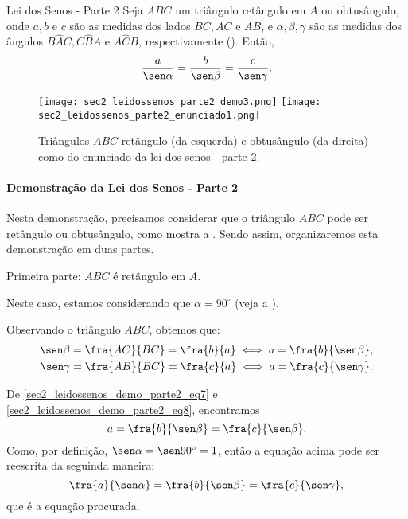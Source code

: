 \begin{observationtitle}{Lei dos Senos - Parte 2}
\label{sec2_leidossenos_parte2}
Seja $ABC$ um triângulo retângulo em $A$ ou obtusângulo, onde $a, b$ e $c$ são as medidas dos lados $BC, AC$ e $AB$, e $\alpha, \beta, \gamma$ são as medidas dos ângulos $B\hat{A}C,C\hat{B}A$ e $A\hat{C}B$, respectivamente (). Então,
\begin{equation}\label{sec2_leidossenos_eq_parte2}
    \frac{a}{\sen\alpha} = \frac{b}{\sen\beta} = \frac{c}{\sen\gamma}.
\end{equation}
\begin{figure}[H]
    \centering
    \texttt{[image: sec2\_leidossenos\_parte2\_demo3.png]}
    \qquad
    \texttt{[image: sec2\_leidossenos\_parte2\_enunciado1.png]}
    \caption{Triângulos $ABC$ retângulo (da esquerda) e obtusângulo (da direita) como do enunciado da lei dos senos - parte 2.}
    \label{sec2_leidossenos_parte2_enunciado_fig}
\end{figure}

\end{observationtitle}


\paragraph{Demonstração da Lei dos Senos - Parte 2}

Nesta demonstração, precisamos considerar que o triângulo $ABC$ pode ser retângulo ou obtusângulo, como mostra a . Sendo assim, organizaremos esta demonstração em duas partes. 

Primeira parte: $ABC$ é retângulo em $A$.

Neste caso, estamos considerando que $\alpha=90^\circ$ (veja a ).

Observando o triângulo $ABC$, obtemos que:
\begin{eqnarray}
\sen\beta=\fra{AC}{BC}=\fra{b}{a} \iff a=\fra{b}{\sen\beta},   \label{sec2_leidossenos_demo_parte2_eq7} \\ 
\sen\gamma=\fra{AB}{BC}=\fra{c}{a} \iff a=\fra{c}{\sen\gamma}.   \label{sec2_leidossenos_demo_parte2_eq8} 
\end{eqnarray}

De \eqref{sec2_leidossenos_demo_parte2_eq7} e \eqref{sec2_leidossenos_demo_parte2_eq8}, encontramos
$$a=\fra{b}{\sen\beta}=\fra{c}{\sen\beta}.$$
Como, por definição, $\sen\alpha=\sen90^\circ=1$, então a equação acima pode ser reescrita da seguinda maneira: 
$$\fra{a}{\sen\alpha}=\fra{b}{\sen\beta}=\fra{c}{\sen\gamma},$$
que é a equação procurada.


